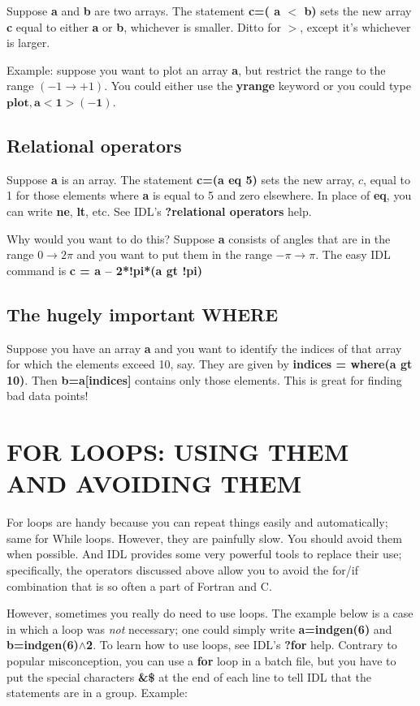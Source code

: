 \documentclass[psfig,preprint]{aastex}
\begin{document}
	Suppose {\bf a} and {\bf b} are two arrays.  The statement {\bf
c=( a $<$ b)} sets the new array {\bf c} equal to either {\bf a} or {\bf
b}, whichever is smaller.  Ditto for $>$, except it's whichever is
larger. 

	Example: suppose you want to plot an array {\bf a}, but restrict
the range to the range $(-1 \rightarrow +1)$.  You could either use the
{\bf yrange} keyword or you could type $\mathbf {plot, a < 1 > (-1)}$. 

\subsection{ Relational operators}

	Suppose {\bf a} is an array. The statement {\bf c=(a eq 5)} sets
the new array, $c$, equal to 1 for those elements where {\bf a} is equal
to 5 and zero elsewhere. In place of {\bf eq}, you can write {\bf ne},
{\bf lt}, etc. See IDL's {\bf ?relational operators} help. 

	Why would you want to do this? Suppose {\bf a} consists of
angles that are in the range $0 \rightarrow 2\pi$ and you want to put
them in the range $-\pi \rightarrow \pi$.  The easy IDL command is 
{\bf c = a -- 2*!pi*(a gt !pi)}

\subsection{ The hugely important WHERE}

	Suppose you have an array {\bf a} and you want to identify the
indices of that array for which the elements exceed 10, say.  They are
given by {\bf indices = where(a gt 10)}.  Then {\bf b=a[indices]}
contains only those elements.  This is great for finding bad data
points!

\section{FOR LOOPS: USING THEM AND AVOIDING THEM}

		For loops are handy because you can repeat things easily and
automatically; same for While loops.  However, they are painfully slow. 
You should avoid them when possible.  And IDL provides some very
powerful tools to replace their use; specifically, the operators
discussed above allow you to avoid the for/if combination that is so
often a part of Fortran and C. 

	However, sometimes you really do need to use loops.  The example
below is a case in which a loop was {\it not} necessary; one could
simply write {\bf a=indgen(6)} and {\bf b=indgen(6)$\wedge$2}.  To learn
how to use loops, see IDL's {\bf ?for} help.  Contrary to popular
misconception, you can use a {\bf for} loop in a batch file, but you
have to put the special characters {\bf \&\$} at the end of each line to
tell IDL that the statements are in a group.  Example:
\end{document}
